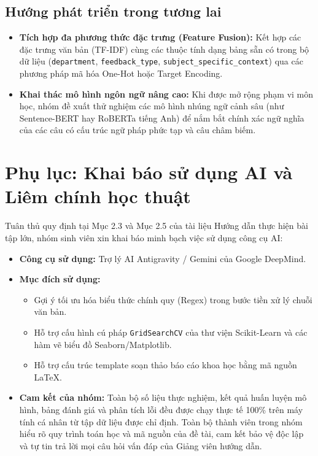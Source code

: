 \documentclass[12pt,a4paper]{article}
\begin{document}
\subsection{Hướng phát triển trong tương lai}
\begin{itemize}
    \item \textbf{Tích hợp đa phương thức đặc trưng (Feature Fusion):} Kết hợp các đặc trưng văn bản (TF-IDF) cùng các thuộc tính dạng bảng sẵn có trong bộ dữ liệu (\texttt{department}, \texttt{feedback\_type}, \texttt{subject\_specific\_context}) qua các phương pháp mã hóa One-Hot hoặc Target Encoding.
    \item \textbf{Khai thác mô hình ngôn ngữ nâng cao:} Khi được mở rộng phạm vi môn học, nhóm đề xuất thử nghiệm các mô hình nhúng ngữ cảnh sâu (như Sentence-BERT hay RoBERTa tiếng Anh) để nắm bắt chính xác ngữ nghĩa của các câu có cấu trúc ngữ pháp phức tạp và câu châm biếm.
\end{itemize}

\newpage
\appendix
\section*{Phụ lục: Khai báo sử dụng AI và Liêm chính học thuật}

Tuân thủ quy định tại Mục 2.3 và Mục 2.5 của tài liệu Hướng dẫn thực hiện bài tập lớn, nhóm sinh viên xin khai báo minh bạch việc sử dụng công cụ AI:
\begin{itemize}
    \item \textbf{Công cụ sử dụng:} Trợ lý AI Antigravity / Gemini của Google DeepMind.
    \item \textbf{Mục đích sử dụng:}
    \begin{itemize}
        \item Gợi ý tối ưu hóa biểu thức chính quy (Regex) trong bước tiền xử lý chuỗi văn bản.
        \item Hỗ trợ cấu hình cú pháp \texttt{GridSearchCV} của thư viện Scikit-Learn và các hàm vẽ biểu đồ Seaborn/Matplotlib.
        \item Hỗ trợ cấu trúc template soạn thảo báo cáo khoa học bằng mã nguồn \LaTeX.
    \end{itemize}
    \item \textbf{Cam kết của nhóm:} Toàn bộ số liệu thực nghiệm, kết quả huấn luyện mô hình, bảng đánh giá và phân tích lỗi đều được chạy thực tế 100\% trên máy tính cá nhân từ tập dữ liệu được chỉ định. Toàn bộ thành viên trong nhóm hiểu rõ quy trình toán học và mã nguồn của đề tài, cam kết bảo vệ độc lập và tự tin trả lời mọi câu hỏi vấn đáp của Giảng viên hướng dẫn.
\end{itemize}



\end{document}
